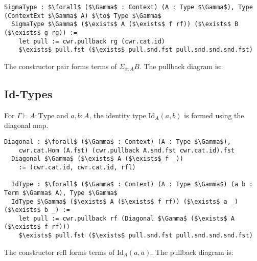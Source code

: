 \documentclass{article}
\begin{document}
\begin{lstlisting}[mathescape=true]
  SigmaType : $\forall$ ($\Gamma$ : Context) (A : Type $\Gamma$), Type (ContextExt $\Gamma$ A) $\to$ Type $\Gamma$
  SigmaType $\Gamma$ ($\exists$ A ($\exists$ f rf)) ($\exists$ B ($\exists$ g rg)) :=
    let pull := cwr.pullback rg (cwr.cat.id)
    $\exists$ pull.fst ($\exists$ pull.snd.fst pull.snd.snd.snd.fst)
\end{lstlisting}

The constructor $\text{pair}$ forms terms of $\Sigma_{x : A} B$. The pullback diagram is:


\newpage
\subsection{Id-Types}
For $\Gamma \vdash A : \text{Type}$ and $a, b : A$, the identity type $\text{Id}_A(a, b)$ is formed using the diagonal map.

\begin{lstlisting}[mathescape=true]
  Diagonal : $\forall$ ($\Gamma$ : Context) (A : Type $\Gamma$),
    cwr.cat.Hom (A.fst) (cwr.pullback A.snd.fst cwr.cat.id).fst
  Diagonal $\Gamma$ ($\exists$ A ($\exists$ f _))
    := (cwr.cat.id, cwr.cat.id, rfl)

  IdType : $\forall$ ($\Gamma$ : Context) (A : Type $\Gamma$) (a b : Term $\Gamma$ A), Type $\Gamma$
  IdType $\Gamma$ ($\exists$ A ($\exists$ f rf)) ($\exists$ a _) ($\exists$ b _) :=
    let pull := cwr.pullback rf (Diagonal $\Gamma$ ($\exists$ A ($\exists$ f rf)))
    $\exists$ pull.fst ($\exists$ pull.snd.fst pull.snd.snd.snd.fst)
\end{lstlisting}

The constructor $\text{refl}$ forms terms of $\text{Id}_A(a, a)$. The pullback diagram is:

\end{document}
